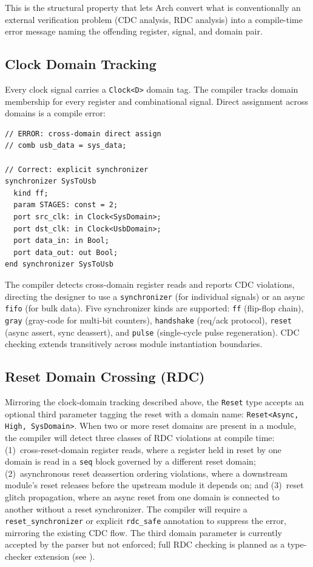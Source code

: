 \documentclass[11pt,twocolumn]{article}
\begin{document}
This is the structural property that lets Arch convert what is conventionally an external verification problem (CDC analysis, RDC analysis) into a compile-time error message naming the offending register, signal, and domain pair.

\subsection{Clock Domain Tracking}
\label{sec:cdc}

Every clock signal carries a \texttt{Clock<D>} domain tag. The compiler tracks domain membership for every register and combinational signal. Direct assignment across domains is a compile error:

\begin{lstlisting}[language=Arch,caption={Clock domain crossing via synchronizer},label={lst:cdc}]
// ERROR: cross-domain direct assign
// comb usb_data = sys_data;

// Correct: explicit synchronizer
synchronizer SysToUsb
  kind ff;
  param STAGES: const = 2;
  port src_clk: in Clock<SysDomain>;
  port dst_clk: in Clock<UsbDomain>;
  port data_in: in Bool;
  port data_out: out Bool;
end synchronizer SysToUsb
\end{lstlisting}

The compiler detects cross-domain register reads and reports CDC violations, directing the designer to use a \texttt{synchronizer} (for individual signals) or an async \texttt{fifo} (for bulk data). Five synchronizer kinds are supported: \texttt{ff} (flip-flop chain), \texttt{gray} (gray-code for multi-bit counters), \texttt{handshake} (req/ack protocol), \texttt{reset} (async assert, sync deassert), and \texttt{pulse} (single-cycle pulse regeneration). CDC checking extends transitively across module instantiation boundaries.

\subsection{Reset Domain Crossing (RDC)}
\label{sec:rdc}

Mirroring the clock-domain tracking described above, the \texttt{Reset} type accepts an optional third parameter tagging the reset with a domain name: \texttt{Reset<Async, High, SysDomain>}. When two or more reset domains are present in a module, the compiler will detect three classes of RDC violations at compile time:
(1)~cross-reset-domain register reads, where a register held in reset by one domain is read in a \texttt{seq} block governed by a different reset domain;
(2)~asynchronous reset deassertion ordering violations, where a downstream module's reset releases before the upstream module it depends on; and
(3)~reset glitch propagation, where an async reset from one domain is connected to another without a reset synchronizer.
The compiler will require a \texttt{reset\_synchronizer} or explicit \texttt{rdc\_safe} annotation to suppress the error, mirroring the existing CDC flow. The third domain parameter is currently accepted by the parser but not enforced; full RDC checking is planned as a type-checker extension (see ).
\end{document}
